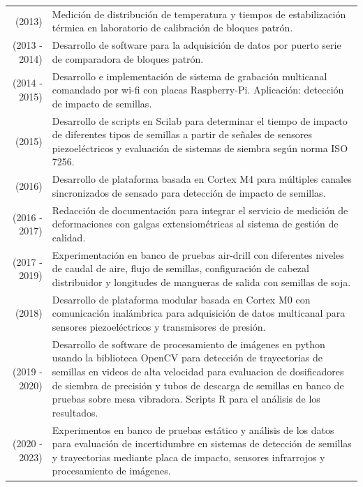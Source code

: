 \documentclass[a4paper,10pt, sans]{article}
\begin{document}
\begin{table}[h!]
\begin{tabularx}{\textwidth}{r X}
        (2013) & Medición de distribución de temperatura y tiempos de estabilización térmica en laboratorio de calibración de bloques patrón. \\ [1ex]
        (2013 - 2014) & Desarrollo de software para la adquisición de datos por puerto serie de comparadora de bloques patrón. \\ [1ex]
        (2014 - 2015) & Desarrollo e implementación de sistema de grabación multicanal comandado por wi-fi con placas Raspberry-Pi. Aplicación: detección de impacto de semillas. \\ [1ex]
        (2015) & Desarrollo de scripts en Scilab para determinar el tiempo de impacto de diferentes tipos de semillas a partir de señales de sensores piezoeléctricos y evaluación de sistemas de siembra según norma ISO 7256. \\ [1ex]
        (2016) & Desarrollo de plataforma basada en Cortex M4 para múltiples canales sincronizados de sensado para detección de impacto de semillas. \\ [1ex]
        (2016 - 2017) & Redacción de documentación para integrar el servicio de medición de deformaciones con galgas extensiométricas al sistema de gestión de calidad. \\ [1ex]
        (2017 - 2019) & Experimentación en banco de pruebas air-drill con diferentes niveles de caudal de aire, flujo de semillas, configuración de cabezal distribuidor y longitudes de mangueras de salida con semillas de soja. \\ [1ex]
        (2018) & Desarrollo de plataforma modular basada en Cortex M0 con comunicación inalámbrica para adquisición de datos multicanal para sensores piezoeléctricos y transmisores de presión. \\ [1ex]
        (2019 - 2020) & Desarrollo de software de procesamiento de imágenes en python usando la biblioteca OpenCV para detección de trayectorias de semillas en videos de alta velocidad para evaluacion de dosificadores de siembra de precisión y tubos de descarga de semillas en banco de pruebas sobre mesa vibradora. Scripts R para el análisis de los resultados. \\ [1ex]
        (2020 - 2023) & Experimentos en banco de pruebas estático y análisis de los datos para evaluación de incertidumbre en sistemas de detección de semillas y trayectorias mediante placa de impacto, sensores infrarrojos y procesamiento de imágenes.
       
  \end{tabularx}
  \end{table}
  
\end{document}
